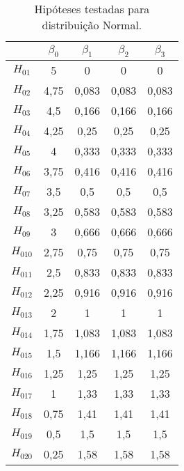 \begin{table}[H]
\centering
\begin{tabular}{ccccc}
\hline
          & $\beta_0$ & $\beta_1$ & $\beta_2$ & $\beta_3$ \\ \hline
$H_{01}$  & 5         & 0         & 0         & 0         \\
$H_{02}$  & 4,75      & 0,083     & 0,083     & 0,083     \\
$H_{03}$  & 4,5       & 0,166     & 0,166     & 0,166     \\
$H_{04}$  & 4,25      & 0,25      & 0,25      & 0,25      \\
$H_{05}$  & 4         & 0,333     & 0,333     & 0,333     \\
$H_{06}$  & 3,75      & 0,416     & 0,416     & 0,416     \\
$H_{07}$  & 3,5       & 0,5       & 0,5       & 0,5       \\
$H_{08}$  & 3,25      & 0,583     & 0,583     & 0,583     \\
$H_{09}$  & 3         & 0,666     & 0,666     & 0,666     \\
$H_{010}$ & 2,75      & 0,75      & 0,75      & 0,75      \\
$H_{011}$ & 2,5       & 0,833     & 0,833     & 0,833     \\
$H_{012}$ & 2,25      & 0,916     & 0,916     & 0,916     \\
$H_{013}$ & 2         & 1         & 1         & 1         \\
$H_{014}$ & 1,75      & 1,083     & 1,083     & 1,083     \\
$H_{015}$ & 1,5       & 1,166     & 1,166     & 1,166     \\
$H_{016}$ & 1,25      & 1,25      & 1,25      & 1,25      \\
$H_{017}$ & 1         & 1,33      & 1,33      & 1,33      \\
$H_{018}$ & 0,75      & 1,41      & 1,41      & 1,41      \\
$H_{019}$ & 0,5       & 1,5       & 1,5       & 1,5       \\
$H_{020}$ & 0,25      & 1,58      & 1,58      & 1,58      \\ \hline
\end{tabular}
\caption{Hipóteses testadas para distribuição Normal.}
\label{tab:th_normal}
\end{table}

